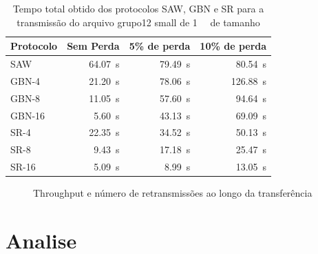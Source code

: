 \documentclass[11pt,a4paper]{article}
\begin{document}
\begin{table}[H]
\begin{center}
\begin{tabular}{@{}lrrr@{}}
\toprule
	\textbf{Protocolo} & \textbf{Sem Perda} & \textbf{5\% de perda} & \textbf{10\% de perda} \\
\midrule

	SAW    & \SI{64.07}{\second} & \SI{79.49}{\second} & \SI{80.54}{\second} \\
	GBN-4  & \SI{21.20}{\second} & \SI{78.06}{\second} & \SI{126.88}{\second} \\
	GBN-8  & \SI{11.05}{\second} & \SI{57.60}{\second} & \SI{94.64}{\second} \\
	GBN-16 & \SI{5.60}{\second}  & \SI{43.13}{\second} & \SI{69.09}{\second} \\
	SR-4   & \SI{22.35}{\second} & \SI{34.52}{\second} & \SI{50.13}{\second} \\
	SR-8   & \SI{9.43}{\second}  & \SI{17.18}{\second} & \SI{25.47}{\second} \\
	SR-16  & \SI{5.09}{\second}  & \SI{8.99}{\second}  & \SI{13.05}{\second} \\

\bottomrule
\end{tabular}
\end{center}
	\caption{Tempo total obtido dos protocolos SAW, GBN e SR para a transmissão do arquivo grupo12 small de \SI{1}{\mebi\byte} de tamanho}
	\label{tab:tempo}
\end{table}


\begin{figure}[H]
\centering
\caption{Throughput e número de retransmissões ao longo da transferência}
\label{fig:graf_rtt}
\end{figure}


\section{Analise}

\end{document}
